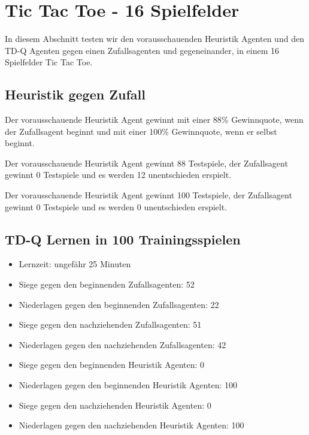 \section{Tic Tac Toe - 16 Spielfelder}
In diesem Abschnitt testen wir den vorausschauenden Heuristik Agenten und den TD-Q Agenten gegen einen Zufallsagenten und gegeneinander, in einem 16 Spielfelder Tic Tac Toe. 

\subsection{Heuristik gegen Zufall}
Der vorausschauende Heuristik Agent gewinnt mit einer 88\% Gewinnquote, wenn der Zufallsagent beginnt und mit einer 100\% Gewinnquote, wenn er selbst beginnt.

Der vorausschauende Heuristik Agent gewinnt 88 Testspiele, der Zufallsagent gewinnt 0 Testspiele und es werden 12 unentschieden erspielt.

Der vorausschauende Heuristik Agent gewinnt 100 Testspiele, der Zufallsagent gewinnt 0 Testspiele und es werden 0 unentschieden erspielt.

\subsection{TD-Q Lernen in 100 Trainingsspielen}
\begin{itemize}
\item Lernzeit: ungefähr 25 Minuten

\item Siege gegen den beginnenden Zufallsagenten: 52
\item Niederlagen gegen den beginnenden Zufallsagenten: 22 

\item Siege gegen den nachziehenden Zufallsagenten: 51
\item Niederlagen gegen den nachziehenden Zufallsagenten: 42 

\item Siege gegen den beginnenden Heuristik Agenten: 0
\item Niederlagen gegen den beginnenden Heuristik Agenten: 100

\item Siege gegen den nachziehenden Heuristik Agenten: 0
\item Niederlagen gegen den nachziehenden Heuristik Agenten: 100
\end{itemize}


